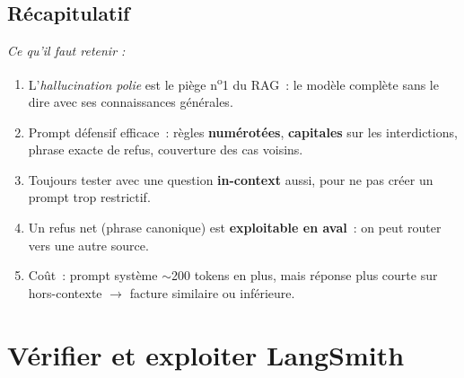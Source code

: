 \documentclass[11pt,a4paper]{article}
\begin{document}
\subsection*{Récapitulatif}
{\itshape\sloppy
\textit{Ce qu'il faut retenir :}
\begin{enumerate}[leftmargin=*]
  \item L'\emph{hallucination polie} est le piège n\textsuperscript{o}1
        du RAG~: le modèle complète sans le dire avec ses connaissances
        générales.
  \item Prompt défensif efficace~: règles \textbf{numérotées},
        \textbf{capitales} sur les interdictions, phrase exacte de refus,
        couverture des cas voisins.
  \item Toujours tester avec une question \textbf{in-context} aussi, pour
        ne pas créer un prompt trop restrictif.
  \item Un refus net (phrase canonique) est \textbf{exploitable en aval}~:
        on peut router vers une autre source.
  \item Coût~: prompt système $\sim$200 tokens en plus, mais réponse
        plus courte sur hors-contexte $\to$ facture similaire ou inférieure.
\end{enumerate}
\par}

\section{Vérifier et exploiter LangSmith}
\end{document}
